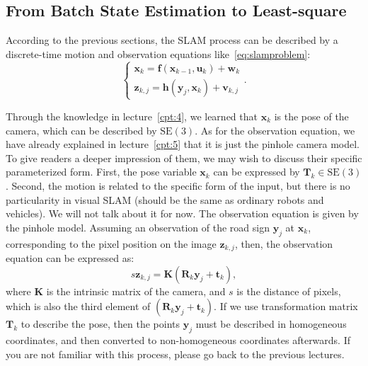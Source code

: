 \subsection{From Batch State Estimation to Least-square}
According to the previous sections, the SLAM process can be described by a discrete-time motion and observation equations like~\eqref{eq:slamproblem}:
\begin{equation}
\left\{ \begin{array}{l}
{\mathbf{x}_k} = \mathbf{f}\left( {{\mathbf{x}_{k - 1}},{\mathbf{u}_k}} \right) + \mathbf{w}_k\\
{\mathbf{z}_{k,j}} = \mathbf{h}\left( {{ \mathbf{y}_j},{ \mathbf{x}_k}}  \right)+ \mathbf{v}_{k,j}
\end{array} \right. .
\end{equation}

Through the knowledge in lecture~\ref{cpt:4}, we learned that $ \mathbf {x} _k $ is the pose of the camera, which can be described by $ \mathrm {SE} (3) $. As for the observation equation, we have already explained in lecture~\ref{cpt:5} that it is just the pinhole camera model. To give readers a deeper impression of them, we may wish to discuss their specific parameterized form. First, the pose variable $\mathbf {x} _k $ can be expressed by $\mathbf {T} _k \in \mathrm {SE} (3) $. Second, the motion is related to the specific form of the input, but there is no particularity in visual SLAM (should be the same as ordinary robots and vehicles). We will not talk about it for now. The observation equation is given by the pinhole model. Assuming an observation of the road sign $ \mathbf {y} _j $ at $ \mathbf {x} _k $, corresponding to the pixel position on the image $ \mathbf {z} _ {k, j} $, then, the observation equation can be expressed as:
\begin{equation}
s \mathbf{z}_{k,j}= \mathbf{K} (\mathbf{R}_k {\mathbf{y}_j}+\mathbf{t}_k),
\end{equation}
where $ \mathbf {K} $ is the intrinsic matrix of the camera, and $s$ is the distance of pixels, which is also the third element of $ (\mathbf {R} _k {\mathbf {y} _j} + \mathbf {t} _k) $. If we use  transformation matrix $ \mathbf {T} _k $ to describe the pose, then the points $ \mathbf {y} _j $ must be described in homogeneous coordinates, and then converted to non-homogeneous coordinates afterwards. If you are not familiar with this process, please go back to the previous lectures.

